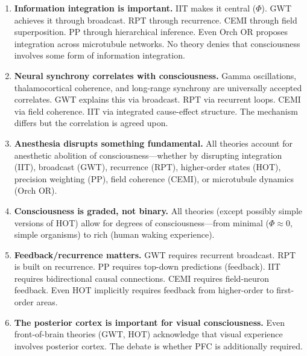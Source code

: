 \documentclass[11pt,a4paper]{report}
\begin{document}
\begin{convergebox}
\begin{enumerate}[leftmargin=1.5em]
  \item \textbf{Information integration is important.} IIT makes it central ($\Phi$). GWT achieves it through broadcast. RPT through recurrence. CEMI through field superposition. PP through hierarchical inference. Even Orch OR proposes integration across microtubule networks. No theory denies that consciousness involves some form of information integration.

  \item \textbf{Neural synchrony correlates with consciousness.} Gamma oscillations, thalamocortical coherence, and long-range synchrony are universally accepted correlates. GWT explains this via broadcast. RPT via recurrent loops. CEMI via field coherence. IIT via integrated cause-effect structure. The mechanism differs but the correlation is agreed upon.

  \item \textbf{Anesthesia disrupts something fundamental.} All theories account for anesthetic abolition of consciousness---whether by disrupting integration (IIT), broadcast (GWT), recurrence (RPT), higher-order states (HOT), precision weighting (PP), field coherence (CEMI), or microtubule dynamics (Orch OR).

  \item \textbf{Consciousness is graded, not binary.} All theories (except possibly simple versions of HOT) allow for degrees of consciousness---from minimal ($\Phi \approx 0$, simple organisms) to rich (human waking experience).

  \item \textbf{Feedback/recurrence matters.} GWT requires recurrent broadcast. RPT is built on recurrence. PP requires top-down predictions (feedback). IIT requires bidirectional causal connections. CEMI requires field-neuron feedback. Even HOT implicitly requires feedback from higher-order to first-order areas.

  \item \textbf{The posterior cortex is important for visual consciousness.} Even front-of-brain theories (GWT, HOT) acknowledge that visual experience involves posterior cortex. The debate is whether PFC is additionally required.
\end{enumerate}
\end{convergebox}


\end{document}
